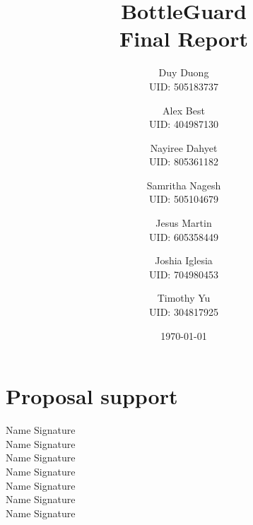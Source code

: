 \documentclass[12pt]{article}
\begin{document}
	\title{BottleGuard\\Final Report}
	\author{Duy Duong\\UID: 505183737 \and Alex Best\\UID: 404987130 \and Nayiree Dahyet \\ UID: 805361182 \and Samritha Nagesh \\UID: 505104679\and Jesus Martin \\UID: 605358449 \and Joshia Iglesia\\UID: 704980453 \and Timothy Yu\\UID: 304817925}
	\date{\today}
	\maketitle

	
	\section*{Proposal support}
	\begin{center}
			Name \underline{\hspace{8cm}}
		Signature \underline{\hspace{3cm}}\\ \vspace{5mm}
		Name \underline{\hspace{8cm}}
		Signature \underline{\hspace{3cm}}\\  \vspace{5mm}
		Name \underline{\hspace{8cm}}
		Signature \underline{\hspace{3cm}}\\  \vspace{5mm}
		Name \underline{\hspace{8cm}}
		Signature \underline{\hspace{3cm}}\\  \vspace{5mm}
		Name \underline{\hspace{8cm}}
		Signature \underline{\hspace{3cm}}\\  \vspace{5mm}
		Name \underline{\hspace{8cm}}
		Signature \underline{\hspace{3cm}}\\  \vspace{5mm}
		Name \underline{\hspace{8cm}}
		Signature \underline{\hspace{3cm}}\\  \vspace{5mm}
	\end{center}
\end{document}
